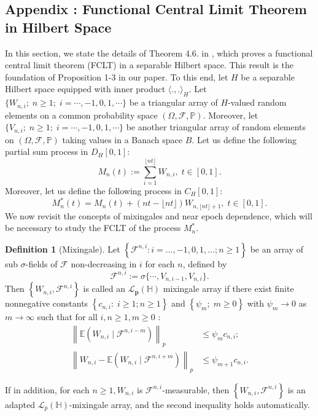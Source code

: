 \documentclass[11pt]{article}
\newcommand{\cL}{\mathcal{L}}
\newcommand{\bE}{\mathbb{E}}
\newcommand{\bP}{\mathbb{P}}
\theoremstyle{plain}
\theoremstyle{definition}
\newtheorem{definition}[theorem]{Definition}
\theoremstyle{remark}
\begin{document}
\begin{appendix}
\section*{Appendix \thesection: Functional Central Limit Theorem in Hilbert Space}\label{appnc}
In this section, we state the details of Theorem 4.6. in \cite{chen1998central}, which proves a functional central limit theorem (FCLT) in a separable Hilbert space. This result is the foundation of Proposition 1-3 in our paper. To this end, let $H$ be a separable Hilbert space equipped with inner product $\langle .,.\rangle_H$. Let $\{W_{n,i};\;n\geq 1;\;i=\cdots,-1,0,1,\cdots\}$ be a triangular array of $H$-valued random elements on a common probability space $(\Omega,\mathcal{F},\bP)$. Moreover, let $\{V_{n,i};\;n\geq 1;\;i=\cdots,-1,0,1,\cdots\}$ be another triangular array of random elements on $(\Omega,\mathcal{F},\bP)$ taking values in a Banach space $B$.  Let us define the following partial sum process in $D_H[0,1]$:
   \[M_n(t):=\sum_{i=1}^{\lfloor nt \rfloor} W_{n,i} ,\;t\in [0,1].\]
   Moreover, let us define the following process in $C_H[0,1]$:
   \[M_n^*(t)=M_n(t)+(nt-\lfloor nt\rfloor)W_{n,\lfloor nt\rfloor+1},\;t\in [0,1].\]   
   We now revisit the concepts of mixingales and near epoch dependence, which will be necessary to study the FCLT of the process $M^*_n$.
\begin{definition}[Mixingale]

    Let $\left\{\mathcal{F}^{n, i}: i=\ldots,-1,0,1, \ldots ; n \geq 1\right\}$ be an array of sub $\sigma$-fields of $\mathcal{F}$ non-decreasing in $i$ for each $n$,  defined by
    \[\mathcal{F}^{n,i}:=\sigma\{\cdots,V_{n,i-1},V_{n,i}\}.\]
     Then $\left\{W_{n, i}, \mathcal{F}^{n, i}\right\}$ is called an $\cL_{\boldsymbol{p}}(\mathbb{H})$ mixingale array if there exist finite nonnegative constants $\left\{c_{n, i}:\; i \geq 1 ; n \geq 1\right\}$ and $\left\{\psi_m ;\; m \geq 0\right\}$ with $\psi_m \rightarrow 0$ as $m \rightarrow \infty$ such that for all $i, n \geq 1, m \geq 0$ :
$$
\begin{aligned}
\left\|\bE\left(W_{n, i} \mid \mathcal{F}^{n, i-m}\right)\right\|_p & \leq \psi_m c_{n, i} ; \\
\left\|W_{n, i}-\bE\left(W_{n, i} \mid \mathcal{F}^{n, i+m}\right)\right\|_p & \leq \psi_{m+1} c_{n, i} .
\end{aligned}
$$

If in addition, for each $n \geq 1, W_{n, i}$ is $\mathcal{F}^{n, i}$-measurable, then $\left\{W_{n, i}, \mathcal{F}^{n, i}\right\}$ is an adapted $\cL_p(\mathbb{H})$-mixingale array, and the second inequality holds automatically.
\end{definition}


\end{appendix}
\end{document}
